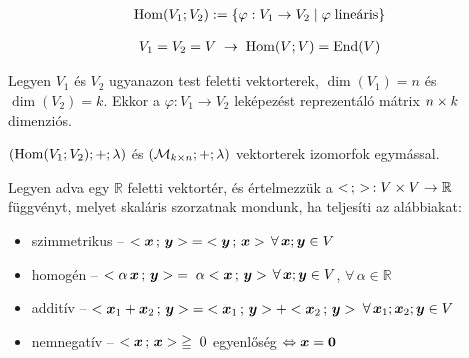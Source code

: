 \documentclass[main.tex]{subfiles}
\begin{document}
\begin{gather*}
  \operatorname{Hom} ( V_1; V_2 ) := \left\{
  \varphi : V_1 \rightarrow V_2 \; | \; \varphi \; \text{lineáris}
  \right\}
\end{gather*}



\begin{gather*}
  V_1 = V_2 = V \; \rightarrow \;
  \operatorname{Hom} ( V; V ) = \operatorname{End} (V)
\end{gather*}




Legyen $V_1$ és $V_2$ ugyanazon test feletti vektorterek,
$\dim(V_1) = n$ és $\dim(V_2) = k$. Ekkor a $\varphi: V_1 \rightarrow V_2$
leképezést reprezentáló mátrix $n \times k$ dimenziós.

\vspace{.5em}
$\left( \operatorname{Hom}(V_1; V_2); +; \lambda\right)$ és
$\left( \mathcal{M}_{k \times n}; +; \lambda\right)$
vektorterek izomorfok egymással.




Legyen adva egy $\mathbb{R}$ feletti vektortér,
és értelmezzük a $< \, ; \, > \, : V \times V \rightarrow \mathbb{R}$
függvényt, melyet skaláris szorzatnak mondunk,
ha teljesíti az alábbiakat:
\begin{itemize}
  \item szimmetrikus
        \tabto{3cm} – \tabto{3.6cm}
        $< \boldsymbol{x} \, ; \, \boldsymbol{y} >
          \;=\;
          < \boldsymbol{y} \, ; \, \boldsymbol{x} >$
        \tabto{12cm}
        $\forall \, \boldsymbol{x}; \boldsymbol{y} \in V$

  \item homogén
        \tabto{3cm} – \tabto{3.6cm}
        $< \alpha \, \boldsymbol{x} \, ; \, \boldsymbol{y} >
          \;=\;
          \alpha < \boldsymbol{x} \, ; \, \boldsymbol{y} >$
        \tabto{12cm}
        $\forall \, \boldsymbol{x}; \boldsymbol{y} \in V$,
        $\forall \, \alpha \in \mathbb{R}$

  \item additív
        \tabto{3cm} – \tabto{3.6cm}
        $< \boldsymbol{x}_1 + \boldsymbol{x}_2 \, ; \, \boldsymbol{y} >
          \;=\;
          < \boldsymbol{x}_1 \, ; \, \boldsymbol{y} > + < \boldsymbol{x}_2 \, ; \, \boldsymbol{y} >$
        \tabto{12cm}
        $\forall \, \boldsymbol{x}_1; \boldsymbol{x}_2; \boldsymbol{y} \in V$

  \item nemnegatív
        \tabto{3cm} – \tabto{3.6cm}
        $< \boldsymbol{x} \, ; \, \boldsymbol{x} > \; \geqq \; 0$
        \tabto{12cm}
        egyenlőség $\Leftrightarrow \boldsymbol{x} = \boldsymbol{0}$
\end{itemize}
\end{document}
